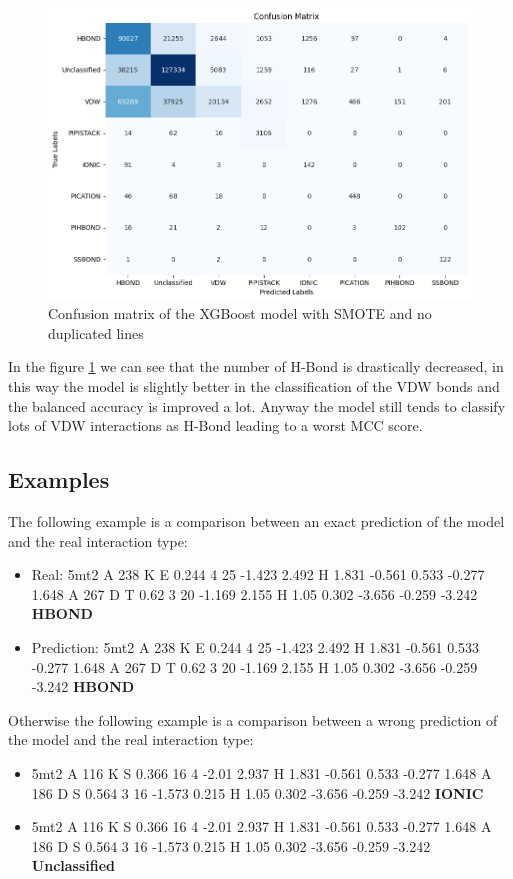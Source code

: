 \documentclass[10pt,twocolumn,letterpaper]{article}
\begin{document}
\begin{center}
    \begin{figure}[h!]
        \centering
        \includegraphics[scale=0.26]{img/cmNoDuplicates.png}
        \caption{Confusion matrix of the XGBoost model with SMOTE and no duplicated lines}
        \label{fig:cmNoDuplicates}
    \end{figure}
\end{center}
In the figure \ref{fig:cmNoDuplicates} we can see that the number of H-Bond is drastically decreased,
in this way the model is slightly better in the classification of the VDW bonds and the balanced accuracy is 
improved a lot. Anyway the model still tends to classify lots of VDW interactions as H-Bond leading to 
a worst MCC score.

\subsection{Examples}
The following example is a comparison between an exact prediction of the model and the real interaction type:
\begin{itemize}
    \item Real: 5mt2 A 238 K E 0.244 4 25 -1.423 2.492 H 1.831 -0.561 0.533 -0.277 1.648 A 267 D T 0.62 3 20 -1.169 2.155 H 1.05 0.302 -3.656 -0.259 -3.242 \textbf{HBOND}
    \item Prediction: 5mt2 A 238 K E 0.244 4 25 -1.423 2.492 H 1.831 -0.561 0.533 -0.277 1.648 A 267 D T 0.62 3 20 -1.169 2.155 H 1.05 0.302 -3.656 -0.259 -3.242 \textbf{HBOND}
\end{itemize} 
Otherwise the following example is a comparison between a wrong prediction of the model and the real interaction type:
\begin{itemize}
    \item 5mt2    A    116         K    S    0.366    16    4    -2.01    2.937    H    1.831    -0.561    0.533    -0.277    1.648    A    186         D    S    0.564    3    16    -1.573    0.215    H    1.05    0.302    -3.656 -0.259 -3.242 \textbf{IONIC}
    \item 5mt2    A    116         K    S    0.366    16    4    -2.01    2.937    H    1.831    -0.561    0.533    -0.277    1.648    A    186         D    S    0.564    3    16    -1.573    0.215    H    1.05    0.302    -3.656 -0.259 -3.242 \textbf{Unclassified}
\end{itemize}
\end{document}
